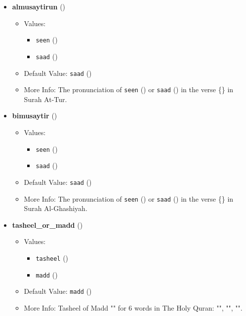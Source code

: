 \begin{itemize}
\item \textbf{almusaytirun} ()
  \begin{itemize}
  \item Values: 
    \begin{itemize}
    \item  \texttt{seen} ()
    \item  \texttt{saad} ()
    \end{itemize}
  \item Default Value: \texttt{saad} ()
  \item More Info: The pronunciation of \texttt{seen} () or \texttt{saad} () in the verse \{\} in Surah At-Tur.
  \end{itemize}

\item \textbf{bimusaytir} ()
  \begin{itemize}
  \item Values: 
    \begin{itemize}
    \item  \texttt{seen} ()
    \item  \texttt{saad} ()
    \end{itemize}
  \item Default Value: \texttt{saad} ()
  \item More Info: The pronunciation of \texttt{seen} () or \texttt{saad} () in the verse \{\} in Surah Al-Ghashiyah.
  \end{itemize}

\item \textbf{tasheel\_or\_madd} ()
  \begin{itemize}
  \item Values: 
    \begin{itemize}
    \item  \texttt{tasheel} ()
    \item  \texttt{madd} ()
    \end{itemize}
  \item Default Value: \texttt{madd} ()
  \item More Info: Tasheel of Madd "" for 6 words in The Holy Quran: "", "", "".
  \end{itemize}


\end{itemize}
